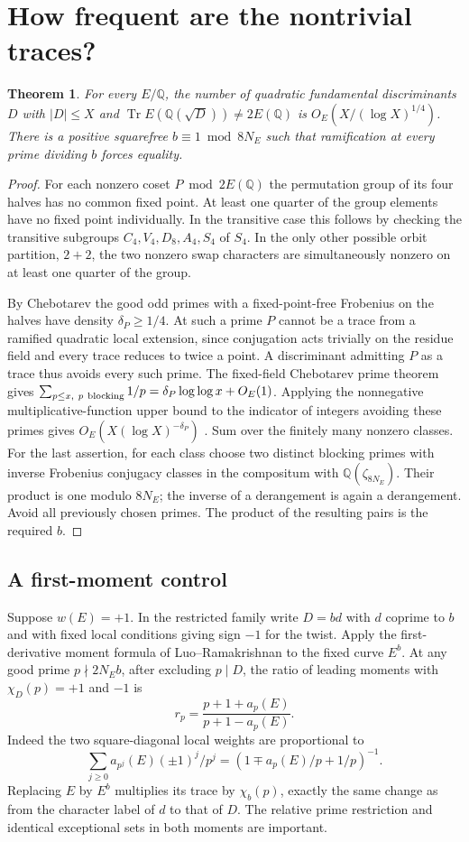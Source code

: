 \documentclass[11pt]{article}
\newtheorem{theorem}{Theorem}[section]\newtheorem{lemma}[theorem]{Lemma}\newtheorem{corollary}[theorem]{Corollary}
\newcommand{\Q}{\mathbb Q}\newcommand{\F}{\mathbb F}\newcommand{\Z}{\mathbb Z}
\DeclareMathOperator{\Tr}{Tr}\DeclareMathOperator{\Sel}{Sel}
\begin{document}
\section{How frequent are the nontrivial traces?}
\begin{theorem}
For every $E/\Q$, the number of quadratic fundamental discriminants $D$ with $|D|\le X$ and $\Tr E(\Q(\sqrt D))\ne2E(\Q)$ is $O_E(X/(\log X)^{1/4})$. There is a positive squarefree $b\equiv1\bmod 8N_E$ such that ramification at every prime dividing $b$ forces equality.
\end{theorem}
\begin{proof}
For each nonzero coset $P\bmod 2E(\Q)$ the permutation group of its four halves has no common fixed point. At least one quarter of the group elements have no fixed point individually. In the transitive case this follows by checking the transitive subgroups $C_4,V_4,D_8,A_4,S_4$ of $S_4$. In the only other possible orbit partition, $2+2$, the two nonzero swap characters are simultaneously nonzero on at least one quarter of the group.

By Chebotarev the good odd primes with a fixed-point-free Frobenius on the halves have density $\delta_P\ge1/4$. At such a prime $P$ cannot be a trace from a ramified quadratic local extension, since conjugation acts trivially on the residue field and every trace reduces to twice a point. A discriminant admitting $P$ as a trace thus avoids every such prime. The fixed-field Chebotarev prime theorem gives $\sum_{p\le x,\ p\ {\rm blocking}}1/p=\delta_P\log\log x+O_E(1)$. Applying the nonnegative multiplicative-function upper bound to the indicator of integers avoiding these primes gives $O_E(X(\log X)^{-\delta_P})$ \cite{ten}. Sum over the finitely many nonzero classes. For the last assertion, for each class choose two distinct blocking primes with inverse Frobenius conjugacy classes in the compositum with $\Q(\zeta_{8N_E})$. Their product is one modulo $8N_E$; the inverse of a derangement is again a derangement. Avoid all previously chosen primes. The product of the resulting pairs is the required $b$.
\end{proof}

\subsection{A first-moment control}
Suppose $w(E)=+1$. In the restricted family write $D=bd$ with $d$ coprime to $b$ and with fixed local conditions giving sign $-1$ for the twist. Apply the first-derivative moment formula of Luo--Ramakrishnan \cite[\S2]{LR} to the fixed curve $E^b$. At any good prime $p\nmid 2N_Eb$, after excluding $p\mid D$, the ratio of leading moments with $\chi_D(p)=+1$ and $-1$ is
\[
                      r_p=\frac{p+1+a_p(E)}{p+1-a_p(E)}.
\]
Indeed the two square-diagonal local weights are proportional to
\[
\sum_{j\ge0}a_{p^j}(E)(\pm1)^j/p^j=(1\mp a_p(E)/p+1/p)^{-1}.
\]
 Replacing $E$ by $E^b$ multiplies its trace by $\chi_b(p)$, exactly the same change as from the character label of $d$ to that of $D$. The relative prime restriction and identical exceptional sets in both moments are important.
\end{document}
